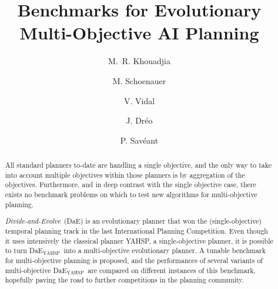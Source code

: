 \documentclass{llncs}
\def\dae{{\em Divide-and-Evolve}}
\def\DAE{{\sc DaE}}
\newcommand{\DAEYAHSP}{{\sc DaE$_{\text{YAHSP}}$}}
\begin{document}
\mainmatter              %
%
\title{Benchmarks for Evolutionary Multi-Objective AI Planning}
%
%
\author{M.~R. Khouadjia  \and M. Schoenauer\and
V. Vidal  \and J. Dr\'eo \and P. Sav\'eant}
%
%
%

\maketitle              %

\begin{abstract}
All standard planners to-date are handling a single objective, and the only way to take into account multiple objectives within those planners is by aggregation of the objectives. Furthermore, and in deep contrast with the single objective case, there exists no benchmark problems on which to test new algorithms for multi-objective planning.

\dae\ (\DAE) is an evolutionary planner that won the (single-objective) temporal planning track in the last International Planning Competition. Even though it uses intensively the classical planner YAHSP, a single-objective planner, it is possible to turn \DAEYAHSP\ into a multi-objective evolutionary planner.
A tunable benchmark for multi-objective planning is proposed, and the performances of several variants of multi-objective \DAEYAHSP\ are compared on different instances of this benchmark, hopefully paving the road to further competitions in the planning community.


\end{abstract}
%
\end{document}
